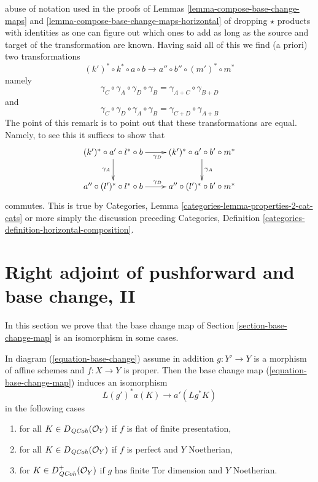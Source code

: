 \begin{remark}
abuse of notation used in the proofs of
Lemmas \ref{lemma-compose-base-change-maps} and
\ref{lemma-compose-base-change-maps-horizontal}
of dropping $\star$ products with identities as one can figure
out which ones to add as long as the source and target of the
transformation are known.
Having said all of this we find (a priori) two transformations
$$
(k')^* \circ k^* \circ a \circ b
\longrightarrow
a'' \circ b'' \circ (m')^* \circ m^*
$$
namely
$$
\gamma_C \circ \gamma_A \circ \gamma_D \circ \gamma_B =
\gamma_{A + C} \circ \gamma_{B + D}
$$
and
$$
\gamma_C \circ \gamma_D \circ \gamma_A \circ \gamma_B =
\gamma_{C + D} \circ \gamma_{A + B}
$$
The point of this remark is to point out that these transformations
are equal. Namely, to see this it suffices to show that
$$
\xymatrix{
(k')^* \circ a' \circ l^* \circ b \ar[r]_{\gamma_D} \ar[d]_{\gamma_A} &
(k')^* \circ a' \circ b' \circ m^* \ar[d]^{\gamma_A} \\
a'' \circ (l')^* \circ l^* \circ b \ar[r]^{\gamma_D} &
a'' \circ (l')^* \circ b' \circ m^*
}
$$
commutes. This is true by
Categories, Lemma \ref{categories-lemma-properties-2-cat-cats}
or more simply the discussion preceding
Categories, Definition \ref{categories-definition-horizontal-composition}.
\end{remark}








\section{Right adjoint of pushforward and base change, II}
\label{section-base-change-II}

\noindent
In this section we prove that the base change map of
Section \ref{section-base-change-map} is an isomorphism
in some cases.

\begin{lemma}
\label{lemma-more-base-change}
In diagram (\ref{equation-base-change}) assume in addition
$g : Y' \to Y$ is a morphism of affine schemes and $f : X \to Y$ is proper.
Then the base change map (\ref{equation-base-change-map}) induces an
isomorphism
$$
L(g')^*a(K) \longrightarrow a'(Lg^*K)
$$
in the following cases
\begin{enumerate}
\item for all $K \in D_{\mathit{QCoh}}(\mathcal{O}_Y)$ if $f$
is flat of finite presentation,
\item for all $K \in D_{\mathit{QCoh}}(\mathcal{O}_Y)$ if $f$
is perfect and $Y$ Noetherian,
\item for $K \in D_{\mathit{QCoh}}^+(\mathcal{O}_Y)$ if $g$ has finite Tor dimension
and $Y$ Noetherian.
\end{enumerate}
\end{lemma}


